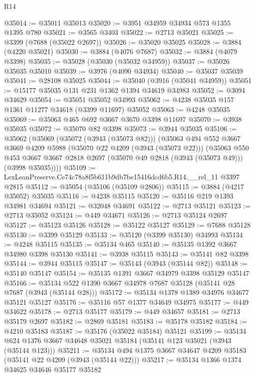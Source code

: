 \begin{lexlean}{R14}
\begin{coremodule}
@35014 := @35011 @35013
@35020 := @3951 @34959 @34934 @573 @1355 @1395 @780
@35021 := @3565 @3403
@35022 := @2713 @35021
@35025 := @3399 (@7688 (@35022 @2697))
@35026 := @35020 @35025
@35028 := @3884 (@4220 @35021)
@35030 := @3884 (@4076 @7687)
@35032 := @3884 (@4079 @3398)
@35035 := @35028 (@35030 (@35032 @34959))
@35037 := @35026 @35035 @35010
@35039 := @3976 (@4090 @34934)
@35040 := @35037 @35039
@35041 := @28108 @35025
@35044 := @35040 (@3916 (@35041 @34959))
@35051 := @15177 @35035 @131 @231 @1362 @1394 @34619 @34983
@35052 := @3094 @34629
@35054 := @35051 @35052 @34993
@35062 := @4238 @35035 @157 @1361 @11277 @34618 (@3399 @11697) @35052
@35063 := @4248 @35035
@35069 := @35063 @465 @692 @3667 @3670 @3398 @11697
@35070 := @3938 @35035
@35072 := @35070 @82 @3398
@35073 := @3944 @35035
@35106 := @35062
    (@35069
      (@35072 (@3943 (@35073 @82)))
      (@35063
        @494
        @552
        @3667
        @3669
        @4209
        @5988
        (@35070 @22 @4209 (@3943 (@35073 @22)))
        (@35063
          @550
          @453
          @3667
          @3667
          @2818
          @2697
          (@35070 @49 @2818 (@3943 (@35073 @49)))
          (@3998 @35035))))
@35109 := LexLeanPreserve.Ce74c78a8f5b611b9db7be15416dcd6b5.R14.__rel_11 @3397 @2815
@35112 := @35054 (@35106 (@35109 @2806))
@35115 := @3884 (@4217 @35052) @35035
@35116 := @4238 @35115
@35120 := @35116 @219 @1393 @34981 @34694
@35121 := @32048 @34691
@35122 := @2713 @35121
@35123 := @2713 @35052
@35124 := @449 @34671
@35126 := @2713 @35124 @2697
@35127 := @35123 @35126
@35128 := @35122 @35127
@35129 := @7688 @35128
@35130 := @3399 @35129
@35133 := @35120 (@3399 @35130) @34993
@35134 := @4248 @35115
@35135 := @35134 @465
@35140 := @35135 @1392 @3667 @34980 @3398 @35130
@35141 := @3938 @35115
@35143 := @35141 @82 @3398
@35144 := @3944 @35115
@35147 := @35143 (@3943 (@35144 @82))
@35148 := @35140 @35147
@35154 := @35135 @1391 @3667 @34979 @3398 @35129 @35147
@35166 := @35134 @522 @1390 @3667 @34978 @7687 @35128 (@35141 @28 @7687 (@3943 (@35144 @28)))
@35172 := @35134 @1378 @1389 @34976 @34677 @35121 @35127
@35176 := @35116 @57 @1377 @34649 @34975
@35177 := @449 @34622
@35178 := @2713 @35177
@35179 := @449 @34657
@35181 := @2713 @35179 @2697
@35182 := @2869 @35181
@35183 := @35178 @35182
@35184 := @4210 @35183
@35187 := @35176 (@35022 @35184) @35121
@35199 := @35134 @624 @1376 @3667 @34648 @35021 @35184 (@35141 @123 @35021 (@3943 (@35144 @123)))
@35211 := @35134 @494 @1375 @3667 @34647 @4209 @35183 (@35141 @22 @4209 (@3943 (@35144 @22)))
@35217 := @35134 @1366 @1374 @34625 @34646 @35177 @35182

\end{coremodule}
\end{lexlean}
